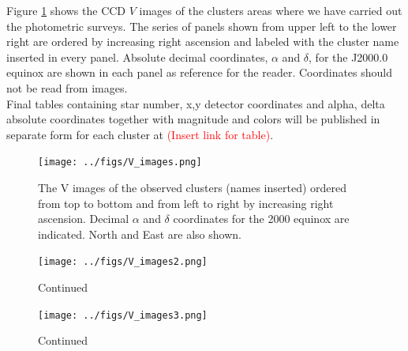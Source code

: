 \documentclass[draft]{aa}
\begin{document}
Figure \ref{fig2} shows the CCD $V$ images of the clusters areas where we have
carried out the photometric surveys. The series of panels shown from upper left
to the lower right are ordered by increasing right ascension and labeled with
the cluster name inserted in every panel. Absolute decimal
coordinates, $\alpha$ and $\delta$, for the J2000.0 equinox are shown in each
panel as reference for the reader. Coordinates should not be read from
images.\\

Final tables containing star number, x,y detector coordinates and alpha,
delta absolute coordinates together with magnitude and colors will be published
in separate form for each cluster at \textcolor{red}{(Insert link for table)}.

\begin{figure}[htp]
    \centering
     \texttt{[image: ../figs/V\_images.png]}   
     \caption{The V images of the observed clusters (names inserted) ordered
     from top to bottom and from left to right by increasing right ascension.
     Decimal $\alpha$ and $\delta$ coordinates for the 2000 equinox are
     indicated. North and East are also shown.}
    \label{fig2}
\end{figure}

\begin{figure}[htp]
    \addtocounter{figure}{-1}
    \centering
    \texttt{[image: ../figs/V\_images2.png]}
    \caption{Continued}
    \label{fig2a}
\end{figure}

\begin{figure}[htp]
    \addtocounter{figure}{-1}
    \centering
    \texttt{[image: ../figs/V\_images3.png]}
    \caption{Continued}
    \label{fig2b}
\end{figure}


\end{document}
